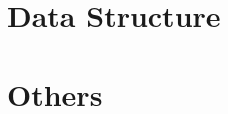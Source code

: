 \documentclass[a4paper,10pt,twocolumn,oneside]{article}
\begin{document}
% 

\section{Data Structure}

% 

% 

% 

% 

%

%

% 

\section{Others}

% 

% 

%

% 
\end{document}
